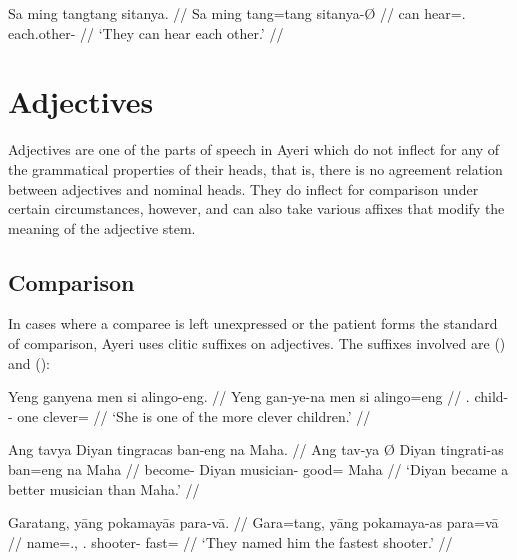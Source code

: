 \a\begingl
	\gla Sa ming tangtang sitanya. //
	\glb Sa ming tang=tang sitanya-Ø //
	\glc \PatT{} can hear=\TplM{}.\Aarg{} each.other-\Top{} //
	\glft `They can hear each other.' //
\endgl

\xe



\section{Adjectives}

Adjectives are one of the parts of speech in Ayeri which do not inflect for any 
of the grammatical properties of their heads, that is, there is no agreement 
relation between adjectives and nominal heads. They do inflect for comparison 
under certain circumstances, however, and can also take various affixes that 
modify the meaning of the adjective stem.

\subsection{Comparison}

In cases where a comparee is left unexpressed or the patient forms the 
standard of comparison, Ayeri uses clitic suffixes on adjectives. The suffixes 
involved are  (\Comp{}) and  (\Supl{}):

\pex\label{ex:sfxcomp}
\a\label{ex:sfxcomp2}\begingl
	\gla Yeng ganyena men si alingo-eng. //
	\glb Yeng gan-ye-na men si alingo=eng //
	\glc \TsgF{}.\Aarg{} child-\Pl{}-\Gen{} one \Rel{} clever=\Comp{} //
	\glft `She is one of the more clever children.' //
\endgl

\a\label{ex:sfxcomp1}\begingl
	\gla Ang tavya {} Diyan tingracas ban-eng na Maha. //
	\glb Ang tav-ya Ø Diyan tingrati-as ban=eng na Maha //
	\glc \AgtT{} become-\TsgM{} \Top{} Diyan musician-\Parg{} good=\Comp{} 
		\Gen{} Maha //
	\glft `Diyan became a better musician than Maha.' //
\endgl


\a\label{ex:sfxsupl}\begingl
	\gla Garatang, yāng pokamayās para-vā. //
	\glb Gara=tang, yāng pokamaya-as para=vā //
	\glc name=\TplM{}.\Aarg{}, \TsgM.\Aarg{} shooter-\Parg{} fast=\Supl{} //
	\glft `They named him the fastest shooter.' //
\endgl\xe

